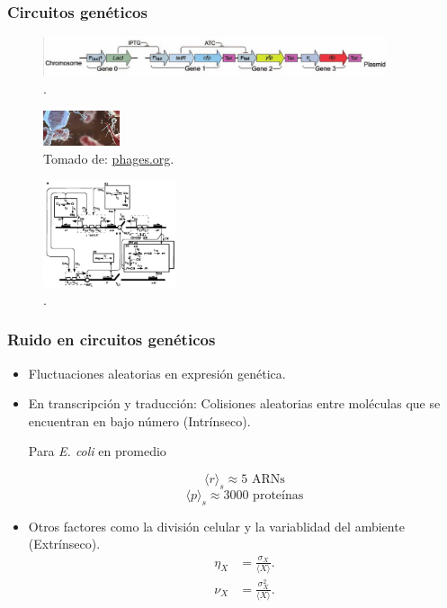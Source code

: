 \documentclass[10pt]{beamer}
\begin{document}
\begin{frame}
\frametitle{Circuitos gen\'eticos}

\begin{figure}[p]
    \centering
    \includegraphics[width=0.9\textwidth]{circuitex.png}\\
    \tiny \cite{pedraza05}.
\end{figure}

\begin{figure}[p]
    \centering
    \includegraphics[width=0.2\textwidth]{phageim.jpg}\\
    \tiny Tomado de: \url{phages.org}.
\end{figure}

\begin{figure}[p]
    \centering
    \includegraphics[width=0.35\textwidth]{lambdacirc.png}\\
    \tiny \cite{arkin98}.
\end{figure}

\end{frame}

\begin{frame}
\frametitle{Ruido en circuitos gen\'eticos}
\begin{itemize}
\item Fluctuaciones aleatorias en expresi\'on gen\'etica.
\item En transcripci\'on y traducci\'on: Colisiones aleatorias entre mol\'eculas que se encuentran en bajo n\'umero (Intr\'inseco).

Para \textit{E. coli} en promedio

$$\langle r\rangle_s \approx 5 \text{ ARNs}$$
$$\langle p\rangle_s \approx 3000 \text{ prote\'inas}$$

\item Otros factores como la divisi\'on celular y la variablidad del ambiente (Extr\'inseco).
\begin{align*}
\eta_X &= \frac{\sigma_X}{\langle X \rangle}.\\[1.5ex]
\nu_X &= \frac{\sigma^2_X}{\langle X \rangle}.
\end{align*}
\end{itemize}
\end{frame}
\end{document}
